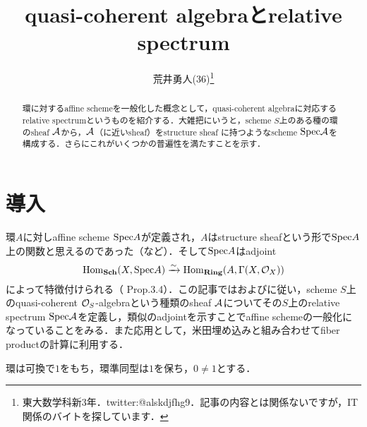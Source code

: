 \documentclass[dvipdfmx,b5paper,papersize]{jsarticle}
\title{quasi-coherent algebraとrelative spectrum}
\author{荒井勇人(36)\footnote{東大数学科新3年．twitter:@alskdjfhg9．記事の内容とは関係ないですが，IT関係のバイトを探しています．}}
\date{}
\theoremstyle{definition}
\begin{document}
\maketitle

\begin{abstract}
  環に対するaffine schemeを一般化した概念として，quasi-coherent algebraに対応するrelative spectrumというものを紹介する．大雑把にいうと，scheme $S$上のある種の環のsheaf $\cal{A}$から，$\cal{A}$（に近いsheaf）をstructure sheaf に持つようなscheme ${\rm Spec}{\cal{A}}$を構成する．さらにこれがいくつかの普遍性を満たすことを示す．

\end{abstract}

\section{導入}
環$A$に対しaffine scheme ${\rm Spec}A$が定義され，$A$はstructure sheafという形で${\rm Spec}A$上の関数と思えるのであった（\cite{ハーツホーン}など）．そして${\rm Spec}A$はadjoint
\[
  {\rm Hom}_{\bf Sch}(X,{\rm Spec}A) \xrightarrow{\sim} {\rm Hom}_{\bf Ring}(A,\Gamma(X,{\cal{O}}_X))
\]
によって特徴付けられる（\cite{Gortz} Prop.3.4）．この記事では\cite{Bosch}および\cite{stacks_project}に従い，scheme $S$上のquasi-coherent ${\cal{O}}_S$-algebraという種類のsheaf $\cal{A}$についてその$S$上のrelative spectrum ${\rm Spec}{\cal{A}}$を定義し，類似のadjointを示すことでaffine schemeの一般化になっていることをみる．また応用として，米田埋め込みと組み合わせてfiber productの計算に利用する．

環は可換で$1$をもち，環準同型は$1$を保ち，$0\neq 1$とする．
\end{document}
